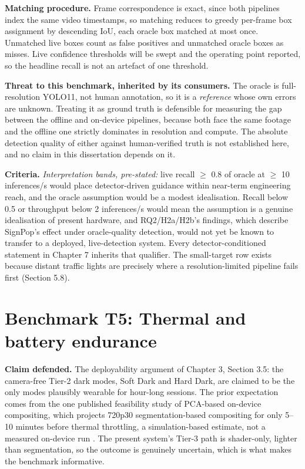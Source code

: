 \textbf{Matching procedure.} Frame correspondence is exact, since both pipelines index the same video
timestamps, so matching reduces to greedy per-frame box assignment by descending IoU, each oracle box
matched at most once. Unmatched live boxes count as false positives and unmatched oracle boxes as
misses. Live confidence thresholds will be swept and the operating point reported, so the headline
recall is not an artefact of one threshold.

\textbf{Threat to this benchmark, inherited by its consumers.} The oracle is full-resolution YOLO11,
not human annotation, so it is a \textit{reference} whose own errors are unknown. Treating it as ground
truth is defensible for measuring the gap between the offline and on-device pipelines, because both
face the same footage and the offline one strictly dominates in resolution and compute. The absolute
detection quality of either against human-verified truth is not established here, and no claim in
this dissertation depends on it.

\textbf{Criteria.} \textit{Interpretation bands, pre-stated:} live recall $\geq$ 0.8 of oracle at $\geq$ 10 inferences/s
would place detector-driven guidance within near-term engineering reach, and the oracle assumption
would be a modest idealisation. Recall below 0.5 or throughput below 2 inferences/s would mean the
assumption is a genuine idealisation of present hardware, and RQ2/H2a/H2b's findings, which
describe SignPop's effect under oracle-quality detection, would not yet be known to transfer to a
deployed, live-detection system. Every detector-conditioned statement in Chapter 7 inherits that
qualifier. The small-target row exists because distant traffic lights are precisely where a
resolution-limited pipeline fails first (Section 5.8).

\section{Benchmark T5: Thermal and battery endurance}

\textbf{Claim defended.} The deployability argument of Chapter 3, Section 3.5: the camera-free Tier-2
dark modes, Soft Dark and Hard Dark, are claimed to be the only modes plausibly wearable for
hour-long sessions. The prior expectation comes from the one published
feasibility study of PCA-based on-device compositing, which projects 720p30 segmentation-based
compositing for only 5–10 minutes before thermal throttling, a simulation-based estimate, not a
measured on-device run \citep{laghari2025}. The present system's Tier-3 path is
shader-only, lighter than segmentation, so the outcome is genuinely uncertain, which is what
makes the benchmark informative.

